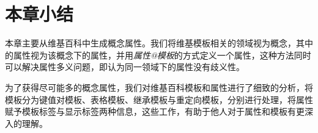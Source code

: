 %
%
\section{本章小结}

本章主要从维基百科中生成概念属性。我们将维基模板相关的领域视为概念，其中的属性视为该概念下的属性，并用\textit{属性@模板}的方式定义一个属性，这种方法同时可以解决属性多义问题，即认为同一领域下的属性没有歧义性。

为了获得尽可能多的概念属性，我们对维基百科模板和属性进行了细致的分析，将模板分为键值对模板、表格模板、继承模板与重定向模板，分别进行处理，将属性赋予模板标签与显示标签两种信息，这些工作，有助于他人对于属性和模板有更深入的理解。

